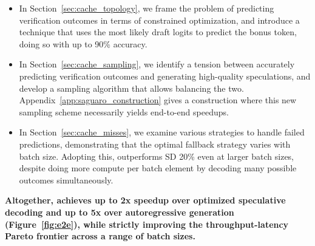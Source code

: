 \begin{itemize}
    \item In Section~\ref{sec:cache_topology}, we frame the 
    problem of predicting verification outcomes in terms of constrained optimization, and introduce a technique that uses the most likely draft logits to predict the bonus token, doing so with up to 90\% accuracy.
    \item In Section~\ref{sec:cache_sampling}, we identify a tension between accurately predicting verification outcomes and generating high-quality speculations, and develop a sampling algorithm that allows balancing the two. Appendix~\ref{app:saguaro_construction} gives a construction where this new sampling scheme necessarily yields end-to-end speedups.
    \item In Section~\ref{sec:cache_misses}, we examine various strategies to handle failed predictions, demonstrating that the optimal fallback strategy varies with batch size.
    Adopting this, \Sys outperforms SD 20\% even at larger batch sizes, despite doing more compute per batch element by decoding many possible outcomes simultaneously.
\end{itemize}

\textbf{Altogether, \Sys achieves up to 2x speedup over optimized speculative decoding and up to 5x over autoregressive generation (Figure~\ref{fig:e2e}), while strictly improving the throughput-latency Pareto frontier across a range of batch sizes.}